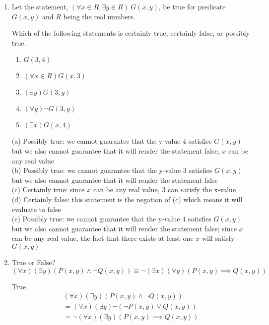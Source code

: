 \documentclass[11pt]{article}
\newenvironment{Answer}{\vspace{20pt}}{\vspace{20pt}}
\begin{document}
\begin{enumerate}
\item
Let the statement, $(\forall x \in R, \exists y \in R) \  G(x,y)$, be
true for predicate $G(x,y)$ and $R$ being the real numbers. 

Which of the following statements is certainly true, certainly false, or possibly true. 

\begin{enumerate}

\item
$G(3,4)$

\item
$(\forall x \in R) G(x,3)$

\item
$(\exists y) G(3,y)$

\item
$(\forall y) \neg G(3,y)$

\item
$(\exists x) G(x,4)$

\end{enumerate}

\begin{Answer}
(a) Possibly true: we cannot guarantee that the y-value 4 satisfies $G(x,y)$ but we also cannot guarantee that it will render the statement false, $x$ can be any real value\\
(b) Possibly true: we cannot guarantee that the y-value 3 satisfies $G(x,y)$ but we also cannot guarantee that it will render the statement false\\
(c) Certainly true: since $x$ can be any real value, 3 can satisfy the x-value\\
(d) Certainly false: this statement is the negation of (c) which means it will evaluate to false\\
(e) Possibly true: we cannot guarantee that the y-value 4 satisfies $G(x,y)$ but we also cannot guarantee that it will render the statement false; since $x$ can be any real value, the fact that there exists at least one $x$ will satisfy $G(x,y)$\\
\end{Answer}


\item True or False? \\
$(\forall x) (\exists y) (P(x,y) \land \neg Q(x,y)) \equiv \neg (\exists x) (\forall y) (P(x,y) \implies Q(x,y))$

\begin{Answer}
True
\begin{equation}
\begin{split}
      (\forall x)(\exists y)(P(x,y) \land \neg Q(x,y))\\
   =(\forall x)(\exists y)\neg(\neg P(x,y) \lor Q(x,y))\\
   =\neg(\forall x)(\exists y)( P(x,y) \implies Q(x,y))
\end{split}
\end{equation}
\end{Answer}


\end{enumerate}
\end{document}
